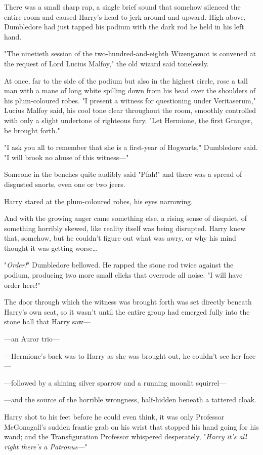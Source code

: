 There was a small sharp rap, a single brief sound that somehow silenced the
entire room and caused Harry's head to jerk around and upward. High above,
Dumbledore had just tapped his podium with the dark rod he held in his left
hand.

"The ninetieth session of the two-hundred-and-eighth Wizengamot is convened at
the request of Lord Lucius Malfoy," the old wizard said tonelessly.

At once, far to the side of the podium but also in the highest circle, rose a
tall man with a mane of long white spilling down from his head over the
shoulders of his plum-coloured robes. "I present a witness for questioning under
Veritaserum," Lucius Malfoy said, his cool tone clear throughout the room,
smoothly controlled with only a slight undertone of righteous fury. "Let
Hermione, the first Granger, be brought forth."

"I ask you all to remember that she is a first-year of Hogwarts," Dumbledore
said. "I will brook no abuse of this witness---"

Someone in the benches quite audibly said "Pfah!" and there was a spread of
disgusted snorts, even one or two jeers.

Harry stared at the plum-coloured robes, his eyes narrowing.

And with the growing anger came something else, a rising sense of disquiet, of
something horribly skewed, like reality itself was being disrupted. Harry knew
that, somehow, but he couldn't figure out what was awry, or why his mind
thought it was getting worse{\ldots}

"\emph{Order!}" Dumbledore bellowed. He rapped the stone rod twice against the
podium, producing two more small clicks that overrode all noise. "I will have
order here!"

The door through which the witness was brought forth was set directly beneath
Harry's own seat, so it wasn't until the entire group had emerged fully into
the stone hall that Harry saw---

---an Auror trio---

---Hermione's back was to Harry as she was brought out, he couldn't see her
face---

---followed by a shining silver sparrow and a running moonlit squirrel---

---and the source of the horrible wrongness, half-hidden beneath a tattered
cloak.

Harry shot to his feet before he could even think, it was only Professor
McGonagall's sudden frantic grab on his wrist that stopped his hand going for
his wand; and the Transfiguration Professor whispered desperately, "\emph{Harry
it's all right there's a Patronus---}"


